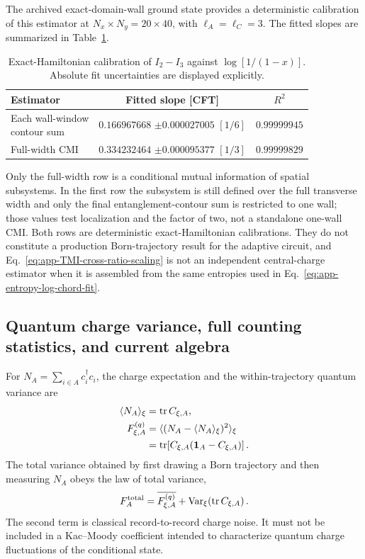 The archived exact-domain-wall ground state provides a deterministic
calibration of this estimator at \(N_x\times N_y=20\times40\), with
\(\ell_A=\ell_C=3\).  The fitted slopes are summarized in
Table~\ref{tab:app-exact-TMI-calibration}.
\begin{table}[t]
\caption{Exact-Hamiltonian calibration of
\(I_2-I_3\) against \(\log[1/(1-x)]\).  Absolute fit uncertainties are
displayed explicitly.}
\label{tab:app-exact-TMI-calibration}
\centering
\footnotesize
\begin{tabular}{@{}lcc@{}}
\toprule
Estimator & Fitted slope [CFT] & \(R^2\)\\
\midrule
\makecell[l]{Each wall-window\\contour sum}
& \makecell{\(0.166967668\)\\\(\pm0.000027005\) \([1/6]\)}
& \(0.99999945\)\\
Full-width CMI
& \makecell{\(0.334232464\)\\\(\pm0.000095377\) \([1/3]\)}
& \(0.99999829\)\\
\bottomrule
\end{tabular}
\end{table}
Only the full-width row is a conditional mutual information of spatial
subsystems.  In the first row the subsystem is still defined over the full
transverse width and only the final entanglement-contour sum is restricted to
one wall; those values test localization and the factor of two, not a
standalone one-wall CMI.  Both rows are deterministic exact-Hamiltonian
calibrations.  They do not constitute a production Born-trajectory result for
the adaptive circuit, and Eq.~\eqref{eq:app-TMI-cross-ratio-scaling} is not an
independent central-charge estimator when it is assembled from the same
entropies used in Eq.~\eqref{eq:app-entropy-log-chord-fit}.

\subsection{Quantum charge variance, full counting statistics, and current algebra}

For
\(N_A=\sum_{i\in A}c_i^\dagger c_i\), the charge expectation and the
within-trajectory quantum variance are
\begin{align}
    \langle N_A\rangle_\xi&=\operatorname{tr}C_{\xi,A},\nonumber\\
    F_{\xi,A}^{(q)}
    &=\langle(N_A-\langle N_A\rangle_\xi)^2\rangle_\xi\nonumber\\
    &=\operatorname{tr}\!\left[C_{\xi,A}(\mathbf{1}_A-C_{\xi,A})\right].
    \label{eq:app-quantum-charge-variance}
\end{align}
The total variance obtained by first drawing a Born trajectory and then
measuring \(N_A\) obeys the law of total variance,
\begin{equation}
    F_A^{\rm total}
    =\overline{F_{\xi,A}^{(q)}}
     +\operatorname{Var}_\xi\!\left(\operatorname{tr}C_{\xi,A}\right).
    \label{eq:app-total-charge-variance}
\end{equation}
The second term is classical record-to-record charge noise.  It must not be
included in a Kac--Moody coefficient intended to characterize quantum charge
fluctuations of the conditional state.

